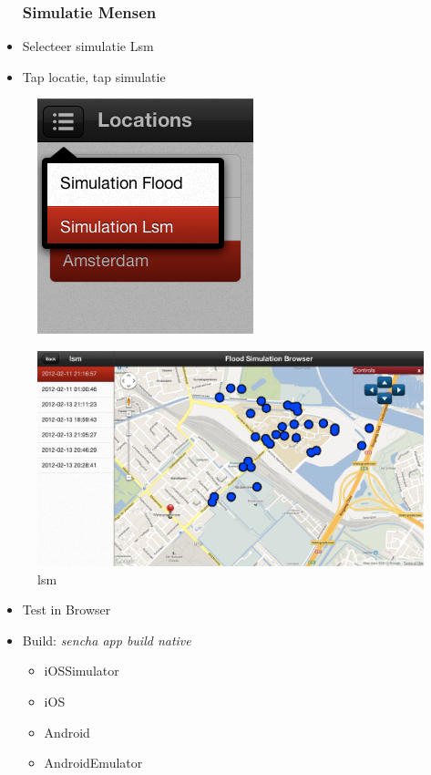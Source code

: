 \documentclass[10pt,a4paper]{beamer}
\begin{document}
\begin{frame}
\begin{itemize}
\frametitle{Simulatie Mensen}
\item Selecteer simulatie Lsm
\item Tap locatie, tap simulatie
\end{itemize}
\begin{figure}
\includegraphics[scale=0.2]{ui/select_lsm.png}
\end{figure}
\begin{figure}
	\includegraphics[scale=0.2]{ui/lsm.png}
	\caption{lsm}
\end{figure}
\end{frame}
\begin{frame}
\begin{itemize}
\frametitle{Deployment}
\item Test in Browser
\item Build: \textit{sencha app build native}
\begin{itemize}
	\item iOSSimulator
	\item iOS
	\item Android
	\item AndroidEmulator
\end{itemize}
\end{itemize}
\end{frame}
\end{document}

